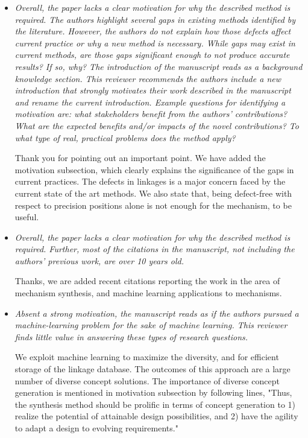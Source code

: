 \documentclass{article}
\begin{document}
\begin{itemize}
  \item \emph{
Overall, the paper lacks a clear motivation for why the described method is required.
The authors highlight several gaps in existing methods identified by the literature.
However, the authors do not explain how those defects affect current practice or why a new method is necessary.
While gaps may exist in current methods, are those gaps significant enough to not produce accurate results? If so, why? The introduction of the manuscript reads as a background knowledge section.
This reviewer recommends the authors include a new introduction that strongly motivates their work described in the manuscript and rename the current introduction.
Example questions for identifying a motivation are: what stakeholders benefit from the authors' contributions? What are the expected benefits and/or impacts of the novel contributions? To what type of real, practical problems does the method apply?
}

Thank you for pointing out an important point. We have added the motivation subsection, which clearly explains the significance of the gaps in current practices.
The defects in linkages is a major concern faced by the current state of the art methods.
We also state that, being defect-free with respect to precision positions alone is not enough for the mechanism, to be useful.
\\

  \item \emph{
Overall, the paper lacks a clear motivation for why the described method is required.
Further, most of the citations in the manuscript, not including the authors' previous work, are over 10 years old.
}

Thanks, we are added recent citations reporting the work in the area of mechanism synthesis, and machine learning applications to mechanisms.
\\

  \item \emph{
    Absent a strong motivation, the manuscript reads as if the authors pursued a machine-learning problem for the sake of machine learning. This reviewer finds little value in answering these types of research questions.
  }

We exploit machine learning to maximize the diversity, and for efficient storage of the linkage database.
The outcomes of this approach are a large number of diverse concept solutions.
The importance of diverse concept generation is mentioned in motivation subsection by following lines,
"Thus, the synthesis method should be prolific in terms of concept generation to 1) realize the potential of attainable design possibilities, and 2) have the agility to adapt a design to evolving requirements."
\\



\end{itemize}
\end{document}
